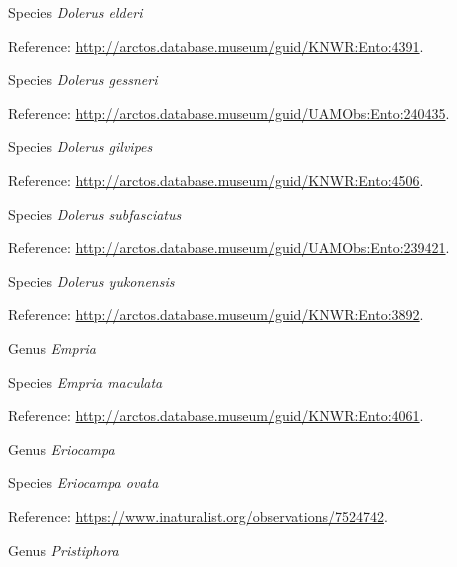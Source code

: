 \documentclass[9pt, article]{memoir}
\begin{document}
\begin{multicols}{2}
\vspace{6pt}\noindent\hspace{36pt}Species \textit{Dolerus elderi}


Reference: 
\url{http://arctos.database.museum/guid/KNWR:Ento:4391}.

\vspace{6pt}\noindent\hspace{36pt}Species \textit{Dolerus gessneri}


Reference: 
\url{http://arctos.database.museum/guid/UAMObs:Ento:240435}.

\vspace{6pt}\noindent\hspace{36pt}Species \textit{Dolerus gilvipes}


Reference: 
\url{http://arctos.database.museum/guid/KNWR:Ento:4506}.

\vspace{6pt}\noindent\hspace{36pt}Species \textit{Dolerus subfasciatus}


Reference: 
\url{http://arctos.database.museum/guid/UAMObs:Ento:239421}.

\vspace{6pt}\noindent\hspace{36pt}Species \textit{Dolerus yukonensis}


Reference: 
\url{http://arctos.database.museum/guid/KNWR:Ento:3892}.

\vspace{6pt}\noindent\hspace{30pt}Genus \textit{Empria}


\vspace{6pt}\noindent\hspace{36pt}Species \textit{Empria maculata}


Reference: 
\url{http://arctos.database.museum/guid/KNWR:Ento:4061}.

\vspace{6pt}\noindent\hspace{30pt}Genus \textit{Eriocampa}


\vspace{6pt}\noindent\hspace{36pt}Species \textit{Eriocampa ovata}


Reference: 
\url{https://www.inaturalist.org/observations/7524742}.

\vspace{6pt}\noindent\hspace{30pt}Genus \textit{Pristiphora}



\end{multicols}
\end{document}
